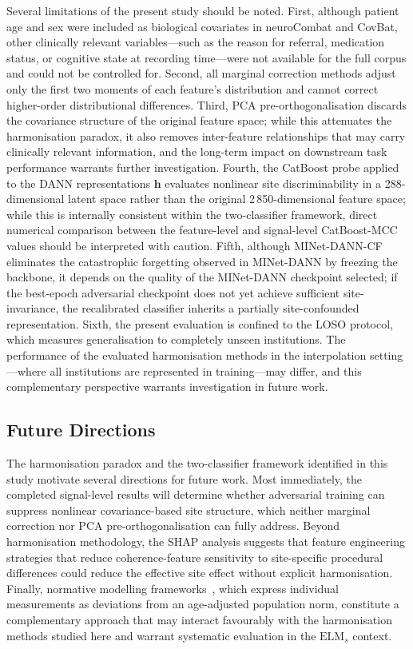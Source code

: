 \documentclass[preprint,12pt]{elsarticle}
\begin{document}
Several limitations of the present study should be noted.
First, although patient age and sex were included as biological
covariates in neuroCombat and CovBat, other clinically relevant
variables---such as the reason for referral, medication status, or
cognitive state at recording time---were not available for the full
corpus and could not be controlled for.
Second, all marginal correction methods adjust only the first two
moments of each feature's distribution and cannot correct
higher-order distributional differences.
Third, PCA pre-orthogonalisation discards the covariance structure
of the original feature space; while this attenuates the
harmonisation paradox, it also removes inter-feature relationships
that may carry clinically relevant information, and the long-term
impact on downstream task performance warrants further investigation.
Fourth, the CatBoost probe applied to the DANN representations
$\mathbf{h}$ evaluates nonlinear site discriminability in a
288-dimensional latent space rather than the original
2\,850-dimensional feature space; while this is internally consistent
within the two-classifier framework, direct numerical comparison
between the feature-level and signal-level CatBoost-MCC values should
be interpreted with caution.
Fifth, although MINet-DANN-CF eliminates the catastrophic forgetting
observed in MINet-DANN by freezing the backbone, it depends on the
quality of the MINet-DANN checkpoint selected; if the best-epoch
adversarial checkpoint does not yet achieve sufficient site-invariance,
the recalibrated classifier inherits a partially site-confounded
representation.
Sixth, the present evaluation is confined to the LOSO protocol, which
measures generalisation to completely unseen institutions.
The performance of the evaluated harmonisation methods in the
interpolation setting---where all institutions are represented in
training---may differ, and this complementary perspective warrants
investigation in future work.

\subsection{Future Directions}
\label{subsec:future}

The harmonisation paradox and the two-classifier framework identified
in this study motivate several directions for future work.
Most immediately, the completed signal-level results will determine
whether adversarial training can suppress nonlinear covariance-based
site structure, which neither marginal correction nor PCA
pre-orthogonalisation can fully address.
Beyond harmonisation methodology, the SHAP analysis suggests that
feature engineering strategies that reduce coherence-feature
sensitivity to site-specific procedural differences could reduce the
effective site effect without explicit harmonisation.
Finally, normative modelling frameworks~\cite{dong2025normative},
which express individual measurements as deviations from an
age-adjusted population norm, constitute a complementary approach
that may interact favourably with the harmonisation methods studied
here and warrant systematic evaluation in the $\mathrm{ELM}_s$
context.
\end{document}
